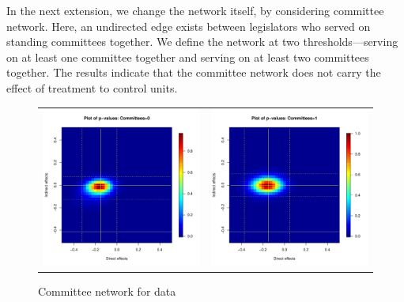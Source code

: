 \documentclass[12pt]{article}
\begin{document}
In the next extension, we change the network itself, by considering committee network. Here, an undirected edge exists between legislators who served on standing committees together.  We define the network at two thresholds---serving on at least one committee together and serving on at least two committees together.  The results indicate that the committee network does not carry the effect of treatment to control units.

\begin{figure}
	\centering
	\begin{tabular}{cc}
	\includegraphics[scale=0.45]{./images/pval_plot_coppock_committee_1ormore.pdf} &
	\includegraphics[scale=0.45]{./images/pval_plot_coppock_committee_2ormore.pdf}
	\end{tabular}
	\caption{Committee network for  \citet{butler2011can} data}
\end{figure}
\end{document}
